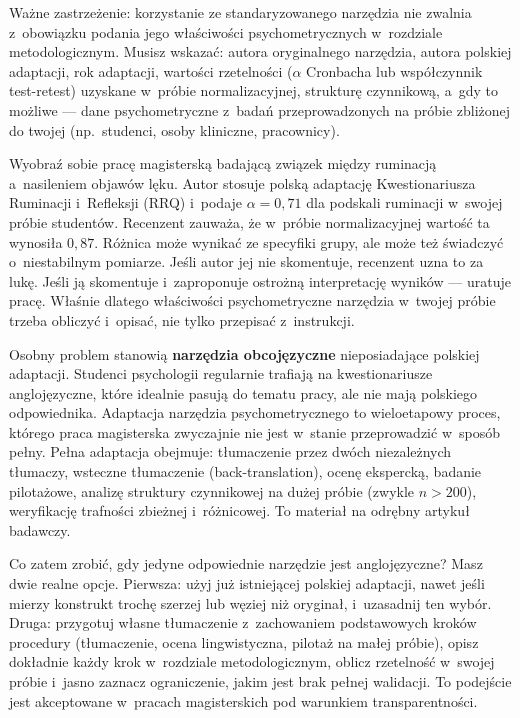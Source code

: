 \documentclass[12pt,a4paper,twoside,openany]{book}
\begin{document}
Ważne zastrzeżenie: korzystanie ze standaryzowanego narzędzia nie zwalnia z~obowiązku podania jego właściwości psychometrycznych w~rozdziale metodologicznym. Musisz wskazać: autora oryginalnego narzędzia, autora polskiej adaptacji, rok adaptacji, wartości rzetelności ($\alpha$ Cronbacha lub współczynnik test-retest) uzyskane w~próbie normalizacyjnej, strukturę czynnikową, a~gdy to możliwe --- dane psychometryczne z~badań przeprowadzonych na próbie zbliżonej do twojej (np.\ studenci, osoby kliniczne, pracownicy).

\begin{examplebox}
Wyobraź sobie pracę magisterską badającą związek między ruminacją a~nasileniem objawów lęku. Autor stosuje polską adaptację Kwestionariusza Ruminacji i~Refleksji (RRQ) i~podaje $\alpha = 0{,}71$ dla podskali ruminacji w~swojej próbie studentów. Recenzent zauważa, że w~próbie normalizacyjnej wartość ta wynosiła $0{,}87$. Różnica może wynikać ze specyfiki grupy, ale może też świadczyć o~niestabilnym pomiarze. Jeśli autor jej nie skomentuje, recenzent uzna to za lukę. Jeśli ją skomentuje i~zaproponuje ostrożną interpretację wyników --- uratuje pracę. Właśnie dlatego właściwości psychometryczne narzędzia w~twojej próbie trzeba obliczyć i~opisać, nie tylko przepisać z~instrukcji.
\end{examplebox}

Osobny problem stanowią \textbf{narzędzia obcojęzyczne} nieposiadające polskiej adaptacji. Studenci psychologii regularnie trafiają na kwestionariusze anglojęzyczne, które idealnie pasują do tematu pracy, ale nie mają polskiego odpowiednika. Adaptacja narzędzia psychometrycznego to wieloetapowy proces, którego praca magisterska zwyczajnie nie jest w~stanie przeprowadzić w~sposób pełny. Pełna adaptacja obejmuje: tłumaczenie przez dwóch niezależnych tłumaczy, wsteczne tłumaczenie (back-translation), ocenę ekspercką, badanie pilotażowe, analizę struktury czynnikowej na dużej próbie (zwykle $n > 200$), weryfikację trafności zbieżnej i~różnicowej. To materiał na odrębny artykuł badawczy.

Co zatem zrobić, gdy jedyne odpowiednie narzędzie jest anglojęzyczne? Masz dwie realne opcje. Pierwsza: użyj już istniejącej polskiej adaptacji, nawet jeśli mierzy konstrukt trochę szerzej lub węziej niż oryginał, i~uzasadnij ten wybór. Druga: przygotuj własne tłumaczenie z~zachowaniem podstawowych kroków procedury (tłumaczenie, ocena lingwistyczna, pilotaż na małej próbie), opisz dokładnie każdy krok w~rozdziale metodologicznym, oblicz rzetelność w~swojej próbie i~jasno zaznacz ograniczenie, jakim jest brak pełnej walidacji. To podejście jest akceptowane w~pracach magisterskich pod warunkiem transparentności.
\end{document}
